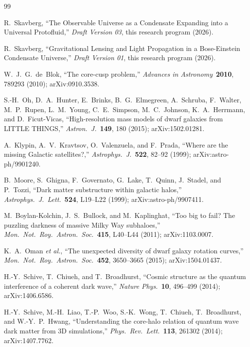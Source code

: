 \documentclass[11pt,a4paper]{article}
\theoremstyle{definition}
\theoremstyle{remark}
\begin{document}
\begin{thebibliography}{99}

R.~Skavberg, ``The Observable Universe as a Condensate Expanding into a Universal Protofluid,''
\emph{Draft Version 03}, this research program (2026).

R.~Skavberg, ``Gravitational Lensing and Light Propagation in a Bose-Einstein Condensate Universe,''
\emph{Draft Version 01}, this research program (2026).


W.~J.~G.~de~Blok,
``The core-cusp problem,''
\emph{Advances in Astronomy}\ \textbf{2010}, 789293 (2010);
arXiv:0910.3538.

S.-H.~Oh, D.~A.~Hunter, E.~Brinks, B.~G.~Elmegreen, A.~Schruba, F.~Walter, M.~P.~Rupen, L.~M.~Young, C.~E.~Simpson, M.~C.~Johnson, K.~A.~Herrmann, and D.~Ficut-Vicas,
``High-resolution mass models of dwarf galaxies from LITTLE THINGS,''
\emph{Astron.\ J.}\ \textbf{149}, 180 (2015);
arXiv:1502.01281.

A.~Klypin, A.~V.~Kravtsov, O.~Valenzuela, and F.~Prada,
``Where are the missing Galactic satellites?,''
\emph{Astrophys.\ J.}\ \textbf{522}, 82--92 (1999);
arXiv:astro-ph/9901240.

B.~Moore, S.~Ghigna, F.~Governato, G.~Lake, T.~Quinn, J.~Stadel, and P.~Tozzi,
``Dark matter substructure within galactic halos,''
\emph{Astrophys.\ J.\ Lett.}\ \textbf{524}, L19--L22 (1999);
arXiv:astro-ph/9907411.

M.~Boylan-Kolchin, J.~S.~Bullock, and M.~Kaplinghat,
``Too big to fail? The puzzling darkness of massive Milky Way subhaloes,''
\emph{Mon.\ Not.\ Roy.\ Astron.\ Soc.}\ \textbf{415}, L40--L44 (2011);
arXiv:1103.0007.

K.~A.~Oman \emph{et al.},
``The unexpected diversity of dwarf galaxy rotation curves,''
\emph{Mon.\ Not.\ Roy.\ Astron.\ Soc.}\ \textbf{452}, 3650--3665 (2015);
arXiv:1504.01437.


H.-Y.~Schive, T.~Chiueh, and T.~Broadhurst,
``Cosmic structure as the quantum interference of a coherent dark wave,''
\emph{Nature Phys.}\ \textbf{10}, 496--499 (2014);
arXiv:1406.6586.

H.-Y.~Schive, M.-H.~Liao, T.-P.~Woo, S.-K.~Wong, T.~Chiueh, T.~Broadhurst, and W.-Y.~P.~Hwang,
``Understanding the core-halo relation of quantum wave dark matter from 3D simulations,''
\emph{Phys.\ Rev.\ Lett.}\ \textbf{113}, 261302 (2014);
arXiv:1407.7762.


\end{thebibliography}
\end{document}
